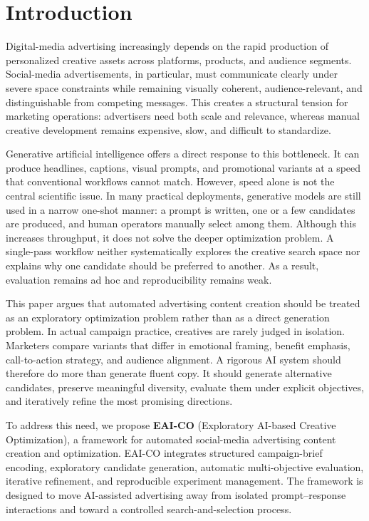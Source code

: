 \documentclass[applsci,article,submit,pdftex,moreauthors]{Definitions/mdpi}
\begin{document}
\section{Introduction}

Digital-media advertising increasingly depends on the rapid production of personalized creative assets across platforms, products, and audience segments. Social-media advertisements, in particular, must communicate clearly under severe space constraints while remaining visually coherent, audience-relevant, and distinguishable from competing messages. This creates a structural tension for marketing operations: advertisers need both scale and relevance, whereas manual creative development remains expensive, slow, and difficult to standardize.

Generative artificial intelligence offers a direct response to this bottleneck. It can produce headlines, captions, visual prompts, and promotional variants at a speed that conventional workflows cannot match. However, speed alone is not the central scientific issue. In many practical deployments, generative models are still used in a narrow one-shot manner: a prompt is written, one or a few candidates are produced, and human operators manually select among them. Although this increases throughput, it does not solve the deeper optimization problem. A single-pass workflow neither systematically explores the creative search space nor explains why one candidate should be preferred to another. As a result, evaluation remains ad hoc and reproducibility remains weak.

This paper argues that automated advertising content creation should be treated as an exploratory optimization problem rather than as a direct generation problem. In actual campaign practice, creatives are rarely judged in isolation. Marketers compare variants that differ in emotional framing, benefit emphasis, call-to-action strategy, and audience alignment. A rigorous AI system should therefore do more than generate fluent copy. It should generate alternative candidates, preserve meaningful diversity, evaluate them under explicit objectives, and iteratively refine the most promising directions.

To address this need, we propose \textbf{EAI-CO} (Exploratory AI-based Creative Optimization), a framework for automated social-media advertising content creation and optimization. EAI-CO integrates structured campaign-brief encoding, exploratory candidate generation, automatic multi-objective evaluation, iterative refinement, and reproducible experiment management. The framework is designed to move AI-assisted advertising away from isolated prompt--response interactions and toward a controlled search-and-selection process.
\end{document}
